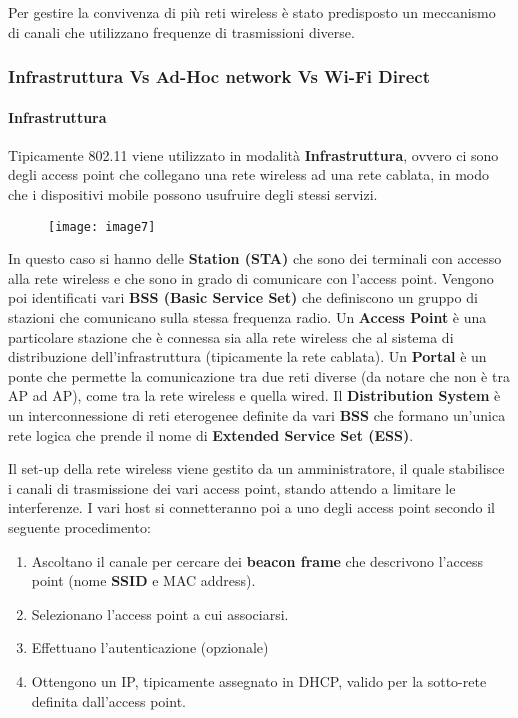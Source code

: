 Per gestire la convivenza di più reti wireless è stato predisposto un
meccanismo di canali che utilizzano frequenze di trasmissioni diverse.

\subsubsection{Infrastruttura Vs Ad-Hoc network Vs Wi-Fi
Direct}\label{infrastruttura-vs-ad-hoc-network-vs-wi-fi-direct}

\paragraph{Infrastruttura }\label{infrastruttura}

Tipicamente 802.11 viene utilizzato in modalità \textbf{Infrastruttura},
ovvero ci sono degli access point che collegano una rete wireless ad una
rete cablata, in modo che i dispositivi mobile possono usufruire degli
stessi servizi.

\begin{figure}[H]
  \centering
  \texttt{[image: image7]}
\end{figure}

In questo caso si hanno delle \textbf{Station (STA)} che sono dei
terminali con accesso alla rete wireless e che sono in grado di
comunicare con l'access point. Vengono poi identificati vari \textbf{BSS
(Basic Service Set)} che definiscono un gruppo di stazioni che
comunicano sulla stessa frequenza radio. Un \textbf{Access Point} è una
particolare stazione che è connessa sia alla rete wireless che al
sistema di distribuzione dell'infrastruttura (tipicamente la rete
cablata). Un \textbf{Portal} è un ponte che permette la comunicazione
tra due reti diverse (da notare che non è tra AP ad AP), come tra la
rete wireless e quella wired. Il \textbf{Distribution System} è un
interconnessione di reti eterogenee definite da vari \textbf{BSS} che
formano un'unica rete logica che prende il nome di \textbf{Extended
Service Set (ESS)}.

Il set-up della rete wireless viene gestito da un amministratore, il
quale stabilisce i canali di trasmissione dei vari access point, stando
attendo a limitare le interferenze. I vari host si connetteranno poi a
uno degli access point secondo il seguente procedimento:

\begin{enumerate}
\def\labelenumi{\arabic{enumi}.}
\item
  Ascoltano il canale per cercare dei \textbf{beacon frame} che
  descrivono l'access point (nome \textbf{SSID} e MAC address).
\item
  Selezionano l'access point a cui associarsi.
\item
  Effettuano l'autenticazione (opzionale)
\item
  Ottengono un IP, tipicamente assegnato in DHCP, valido per la
  sotto-rete definita dall'access point.
\end{enumerate}

